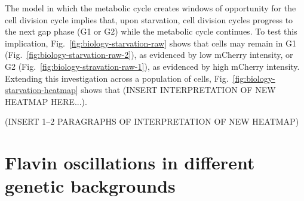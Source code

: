 The model in which the metabolic cycle creates windows of opportunity for the cell division cycle implies that, upon starvation, cell division cycles progress to the next gap phase (G1 or G2) while the metabolic cycle continues.
To test this implication, Fig.\ \ref{fig:biology-starvation-raw} shows that cells may remain in G1 (Fig.\ \ref{fig:biology-starvation-raw-2}), as evidenced by low mCherry intensity, or G2 (Fig.\ \ref{fig:biology-stravation-raw-1}), as evidenced by high mCherry intensity.
Extending this investigation across a population of cells, Fig.\ \ref{fig:biology-starvation-heatmap} shows that (INSERT INTERPRETATION OF NEW HEATMAP HERE...).

(INSERT 1--2 PARAGRAPHS OF INTERPRETATION OF NEW HEATMAP)


\section{Flavin oscillations in different genetic backgrounds}
\label{sec:biology-backgrounds}


